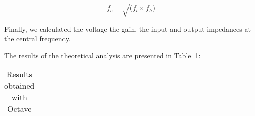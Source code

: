 \begin{equation}
f_c=\sqrt(f_l\times f_h)
\end{equation}

Finally, we calculated the voltage the gain, the input and output impedances at the central frequency.

The results of the theoretical analysis are presented in Table~\ref{tab:resultsteo}:

\begin{table}[H]
  \centering
  \begin{tabular}{|l|r|}
    \hline    
    
  \end{tabular}
  \caption{Results obtained with Octave}
  \label{tab:resultsteo}
\end{table}

